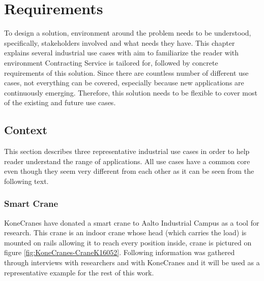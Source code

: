 \chapter{Requirements}
\label{chapter:requirements}

To design a solution, environment around the problem needs to be understood, specifically, stakeholders involved and what needs they have. This chapter explains several industrial use cases with aim to familiarize the reader with environment Contracting Service is tailored for, followed by concrete requirements of this solution. Since there are countless number of different use cases, not everything can be covered, especially because new applications are continuously emerging. Therefore, this solution needs to be flexible to cover most of the existing and future use cases.  

\section{Context}
\label{section:context}

This section describes three representative industrial use cases in order to help reader understand the range of applications. All use cases have a common core even though they seem very different from each other as it can be seen from the following text.

\subsection{Smart Crane}

KoneCranes have donated a smart crane to Aalto Industrial Campus as a tool for research. This crane is an indoor crane whose head (which carries the load) is mounted on rails allowing it to reach every position inside, crane is pictured on figure \ref{fig:KoneCranes-CraneK16052}. Following information was gathered through interviews with researchers and with KoneCranes and it will be used as a representative example for the rest of this work.

